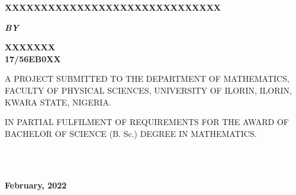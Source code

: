 \documentclass[11pt]{report}
\newcommand{\bt}[1]{\textbf{#1}}
\begin{document}
	
	\clearpage
	\thispagestyle{empty}
	\begin{center}
		\Large \bt{XXXXXXXXXXXXXXXXXXXXXXXXXXXXXX}
	\end{center}
	
	\hspace{7cm}
	
	\begin{center}
		\textbf{\textit{BY}}
	\end{center}
	
	\hspace{5cm}
	
	\begin{center}
		\large \textbf{XXXXXXX
			\\
			17/56EB0XX}
	\end{center}
	
	\hspace{9cm}
	
	\begin{center}
		A PROJECT SUBMITTED TO THE DEPARTMENT OF MATHEMATICS, FACULTY OF PHYSICAL SCIENCES, UNIVERSITY OF ILORIN, ILORIN, KWARA STATE, NIGERIA.
	\end{center}
	
	\hspace{7cm}
	
	\begin{center}
		IN PARTIAL FULFILMENT OF REQUIREMENTS FOR THE AWARD OF BACHELOR OF SCIENCE (B. Sc.) DEGREE IN MATHEMATICS.
	\end{center}
	\hspace{5cm}
	\\ \\ 
	\begin{center}
		\textbf{February, 2022}
	\end{center}
	
	\newpage
\end{document}
